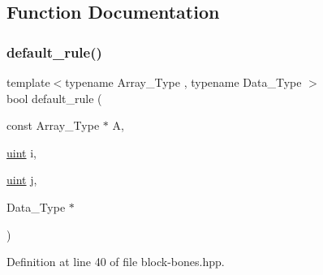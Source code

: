 \subsection{Function Documentation}
\mbox{\label{block-bones_8hpp_a4aff3c5c755b16bc4634ab8d8e7fb3f6}} 
\subsubsection{\texorpdfstring{default\+\_\+rule()}{default\_rule()}}
{\footnotesize\ttfamily template$<$typename Array\+\_\+\+Type , typename Data\+\_\+\+Type $>$ \\
bool default\+\_\+rule (\begin{DoxyParamCaption}\item[{const Array\+\_\+\+Type $\ast$}]{A,  }\item[{\hyperlink{typedefs_8hpp_a91ad9478d81a7aaf2593e8d9c3d06a14}{uint}}]{i,  }\item[{\hyperlink{typedefs_8hpp_a91ad9478d81a7aaf2593e8d9c3d06a14}{uint}}]{j,  }\item[{Data\+\_\+\+Type $\ast$}]{ }\end{DoxyParamCaption})\hspace{0.3cm}{\ttfamily [inline]}}



Definition at line 40 of file block-\/bones.\+hpp.

